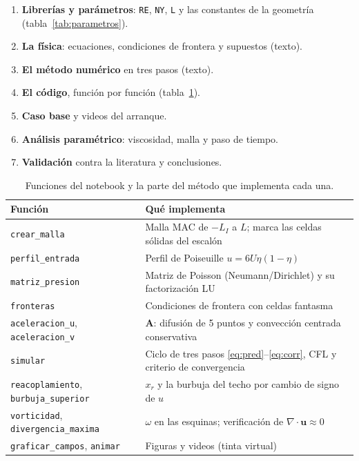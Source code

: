 \documentclass[11pt,letterpaper]{article}
\newcommand{\vu}{\mathbf{u}}
\begin{document}
\begin{enumerate}[label=\textbf{\arabic*.}, start=0]
  \item \textbf{Librerías y parámetros}: \texttt{RE}, \texttt{NY}, \texttt{L} y las constantes de la geometría
    (tabla~\ref{tab:parametros}).
  \item \textbf{La física}: ecuaciones, condiciones de frontera y supuestos (texto).
  \item \textbf{El método numérico} en tres pasos (texto).
  \item \textbf{El código}, función por función (tabla~\ref{tab:funciones}).
  \item \textbf{Caso base} y videos del arranque.
  \item \textbf{Análisis paramétrico}: viscosidad, malla y paso de tiempo.
  \item \textbf{Validación} contra la literatura y conclusiones.
\end{enumerate}

\begin{table}[H]
\centering\small
\caption{Funciones del notebook y la parte del método que implementa cada una.}
\label{tab:funciones}
\begin{tabular}{@{}ll@{}}
\toprule
Función & Qué implementa\\
\midrule
\texttt{crear\_malla} & Malla MAC de $-L_I$ a $L$; marca las celdas sólidas del escalón\\
\texttt{perfil\_entrada} & Perfil de Poiseuille $u=6U\eta(1-\eta)$\\
\texttt{matriz\_presion} & Matriz de Poisson (Neumann/Dirichlet) y su factorización LU\\
\texttt{fronteras} & Condiciones de frontera con celdas fantasma\\
\texttt{aceleracion\_u}, \texttt{aceleracion\_v} & $\mathbf A$: difusión de 5 puntos y convección centrada conservativa\\
\texttt{simular} & Ciclo de tres pasos \eqref{eq:pred}--\eqref{eq:corr}, CFL y criterio de convergencia\\
\texttt{reacoplamiento}, \texttt{burbuja\_superior} & $x_r$ y la burbuja del techo por cambio de signo de $u$\\
\texttt{vorticidad}, \texttt{divergencia\_maxima} & $\omega$ en las esquinas; verificación de $\nabla\cdot\vu\approx0$\\
\texttt{graficar\_campos}, \texttt{animar} & Figuras y videos (tinta virtual)\\
\bottomrule
\end{tabular}
\end{table}
\end{document}
